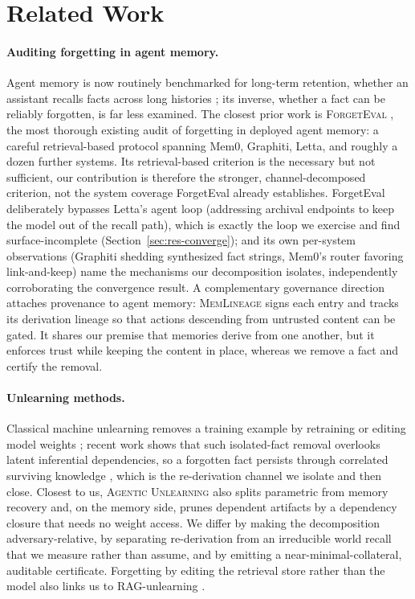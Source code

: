 \documentclass[letterpaper]{article}
\begin{document}
\section{Related Work}\label{sec:related}

\paragraph{Auditing forgetting in agent memory.} Agent memory is now routinely
benchmarked for long-term retention, whether an assistant recalls facts
across long histories \citep{maharana2024locomo,wu2025longmemeval}; its inverse,
whether a fact can be reliably forgotten, is far less examined. The closest
prior work is \textsc{ForgetEval} \citep{forgeteval}, the most thorough existing
audit of forgetting in deployed agent memory: a careful retrieval-based protocol
spanning Mem0, Graphiti, Letta, and roughly a dozen further systems. 
Its retrieval-based criterion is the necessary but not sufficient, our
contribution is therefore the stronger, channel-decomposed criterion, not the
system coverage ForgetEval already establishes. 
ForgetEval deliberately bypasses Letta's agent loop (addressing
archival endpoints to keep the model out of the recall path), which is exactly the
loop we exercise and find surface-incomplete (Section~\ref{sec:res-converge}); and its
own per-system observations (Graphiti shedding synthesized fact strings, Mem0's
router favoring link-and-keep) name the mechanisms our decomposition isolates,
independently corroborating the convergence result. A complementary governance
direction attaches provenance to agent memory: \textsc{MemLineage}
\citep{memlineage} signs each entry and tracks its derivation lineage so that actions
descending from untrusted content can be gated. It shares our premise that memories
derive from one another, but it enforces trust while keeping the content in
place, whereas we remove a fact and certify the removal.

\paragraph{Unlearning methods.} Classical machine unlearning removes a training example
by retraining or editing model weights
\citep{bourtoule2021unlearning,cao2015towards,nguyen2022survey}; recent work shows that
such isolated-fact removal overlooks latent inferential dependencies, so a forgotten fact persists through correlated surviving knowledge \citep{dollmsforget}, which is the re-derivation channel we isolate and then close. Closest to us,
\textsc{Agentic Unlearning} \citep{agenticunlearning} also splits parametric from memory
recovery and, on the memory side, prunes dependent artifacts by a
dependency closure that needs no weight access. We differ by making the decomposition
adversary-relative, by separating re-derivation from an irreducible world
recall that we measure rather than assume, and by emitting a near-minimal-collateral,
auditable certificate. Forgetting by editing the retrieval store rather than the model also links
us to RAG-unlearning \citep{ragunlearn}.
\end{document}
